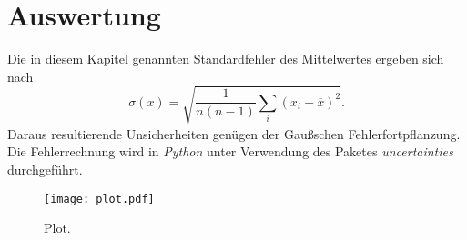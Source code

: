 \chapter{Auswertung}
\label{cha:Auswertung}
Die in diesem Kapitel genannten Standardfehler des Mittelwertes ergeben sich nach
\begin{equation*}
  \label{eqn:MW-Fehler}
  \sigma(x) = \sqrt{\frac{1}{n(n-1)} \sum_i (x_i - \overline{x})^2}.
\end{equation*}
Daraus resultierende Unsicherheiten genügen der Gaußschen Fehlerfortpflanzung.
Die Fehlerrechnung wird in \textit{Python} unter Verwendung des Paketes \textit{uncertainties} \cite{uncertainties} durchgeführt.



\begin{figure}
    \centering
    \texttt{[image: plot.pdf]}
    \caption{Plot.}
    \label{fig:plot}
\end{figure}